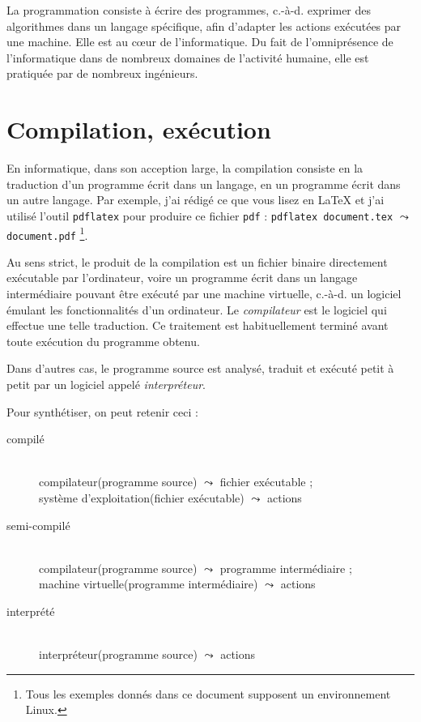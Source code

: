 \documentclass[a4paper,francais]{insalyon}
\newcommand{\cad}{c.-à-d.}
\begin{document}
La programmation consiste à écrire des programmes, {\cad} exprimer des algorithmes dans un langage spécifique, afin d'adapter les actions exécutées par une machine. Elle est au c\oe ur de l'informatique. Du fait de l'omniprésence de l'informatique dans de nombreux domaines de l'activité humaine, elle est pratiquée par de nombreux ingénieurs. 


\section{Compilation, exécution}

En informatique, dans son acception large, la compilation consiste en la traduction d'un programme écrit dans un langage, en un programme écrit dans un autre langage. Par exemple, j'ai rédigé ce que vous lisez en {\LaTeX} et j'ai utilisé l'outil \texttt{pdflatex} pour produire ce fichier \texttt{pdf} : \texttt{pdflatex document.tex} $\leadsto$ \texttt{document.pdf}
\footnote{Tous les exemples donnés dans ce document supposent un environnement Linux.}.  

Au sens strict, le produit de la compilation est un fichier binaire directement exécutable par l'ordinateur, voire un programme écrit dans un langage intermédiaire pouvant être exécuté par une machine virtuelle, {\cad} un logiciel émulant les fonctionnalités d'un ordinateur. Le \emph{compilateur} est le logiciel qui effectue une telle traduction. Ce traitement est habituellement terminé avant toute exécution du programme obtenu.

Dans d'autres cas, le programme source est analysé, traduit et exécuté petit à petit par un logiciel appelé \emph{interpréteur}.

Pour synthétiser, on peut retenir ceci :
\begin{description}
\item[compilé] ~\\ compilateur(programme source) $\leadsto$ fichier exécutable ; \\
  système d'exploitation(fichier exécutable) $\leadsto$ actions
\item[semi-compilé] ~\\ compilateur(programme source) $\leadsto$ programme intermédiaire ; \\
  machine virtuelle(programme intermédiaire) $\leadsto$ actions
\item[interprété] ~\\ interpréteur(programme source) $\leadsto$ actions
\end{description}
\end{document}
